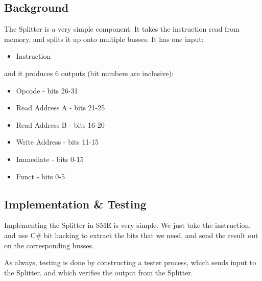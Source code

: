\documentclass{beamer}
\begin{document}
\subsection{Background}
\begin{frame}
    The Splitter is a very simple component. It takes the instruction read from
    memory, and splits it up onto multiple busses. It has one input:
    \begin{itemize}
        \item Instruction
    \end{itemize}
    and it produces 6 outputs (bit numbers are inclusive):
    \begin{itemize}
        \item Opcode - bits 26-31
        \item Read Address A - bits 21-25
        \item Read Address B - bits 16-20
        \item Write Address - bits 11-15
        \item Immediate - bits 0-15
        \item Funct - bits 0-5
    \end{itemize}
\end{frame}
\begin{frame}
    \begin{figure}
    \end{figure}
\end{frame}
\subsection{Implementation \& Testing}
\begin{frame}
    Implementing the Splitter in SME is very simple. We just take the
    instruction, and use C\# bit hacking to extract the bits that we need, and
    send the result out on the corresponding busses.

    \vspace{\baselineskip}
    As always, testing is done by constructing a tester process, which sends
    input to the Splitter, and which verifies the output from the Splitter.
\end{frame}
\end{document}
